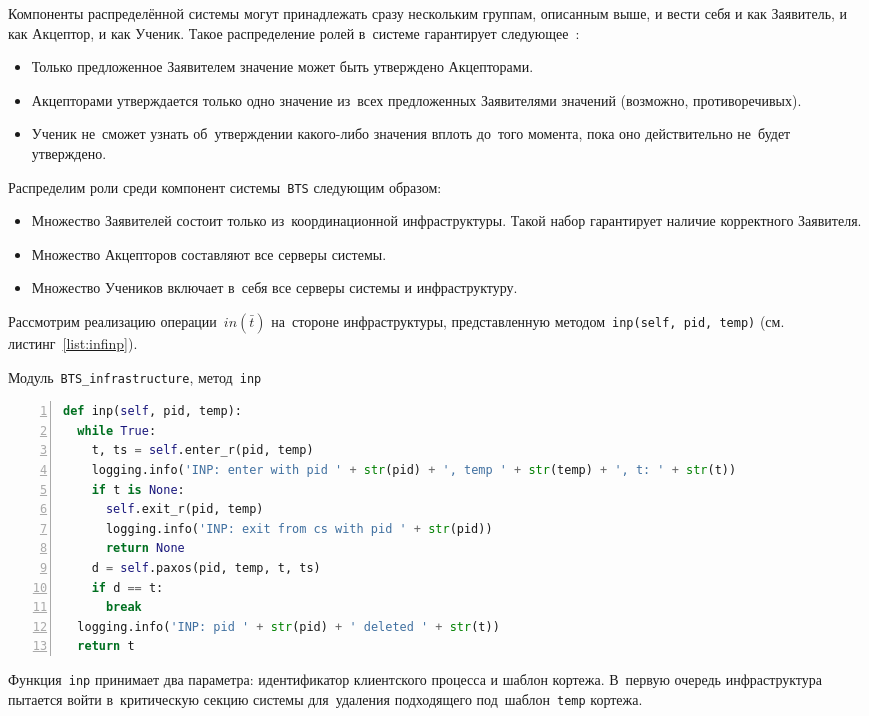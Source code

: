 Компоненты распределённой системы могут принадлежать сразу нескольким группам, описанным выше, и вести себя и как Заявитель, и как Акцептор, и как Ученик. Такое распределение ролей в~системе гарантирует следующее~\autocite{Lamport}:
\begin{itemize}
	\item Только предложенное Заявителем значение может быть утверждено Акцепторами.
	\item Акцепторами утверждается только одно значение из~всех предложенных Заявителями значений (возможно, противоречивых).
	\item Ученик не~сможет узнать об~утверждении какого-либо значения вплоть до~того момента, пока оно действительно не~будет утверждено.
\end{itemize}

Распределим роли среди компонент системы~\texttt{BTS} следующим образом:
\begin{itemize}
	\item Множество Заявителей состоит только из~координационной инфраструктуры. Такой набор гарантирует наличие корректного Заявителя.
	\item Множество Акцепторов составляют все серверы системы.
	\item Множество Учеников включает в~себя все серверы системы и инфраструктуру.
\end{itemize}

Рассмотрим реализацию операции~$in(\bar t)$ на~стороне инфраструктуры, представленную методом~\texttt{inp(self, pid, temp)} (см.\,листинг~\ref{list:infinp}). 
\begin{ListingEnv}\caption{Модуль~\texttt{BTS\_infrastructure}, метод~\texttt{inp}}\label{list:infinp}
	\begin{lstlisting}[language=Python, numbers=left]
def inp(self, pid, temp):
  while True:
    t, ts = self.enter_r(pid, temp)
    logging.info('INP: enter with pid ' + str(pid) + ', temp ' + str(temp) + ', t: ' + str(t))
    if t is None:
      self.exit_r(pid, temp)
      logging.info('INP: exit from cs with pid ' + str(pid))
      return None
    d = self.paxos(pid, temp, t, ts)   
    if d == t:
      break
  logging.info('INP: pid ' + str(pid) + ' deleted ' + str(t))
  return t
	\end{lstlisting}
\end{ListingEnv}
Функция~\texttt{inp} принимает два параметра: идентификатор клиентского процесса и шаблон кортежа. В~первую очередь инфраструктура пытается войти в~критическую секцию системы для~удаления подходящего под~шаблон~\texttt{temp} кортежа.

